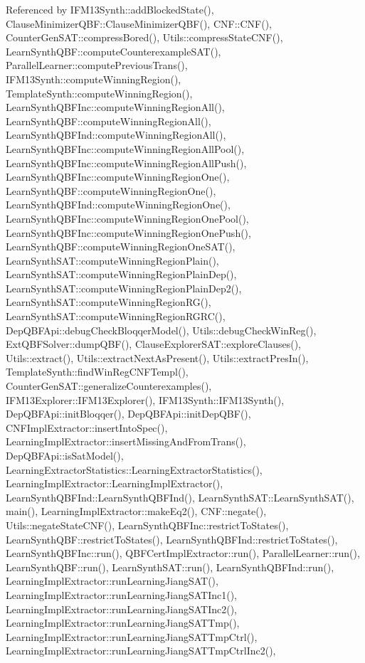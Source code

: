 Referenced by I\-F\-M13\-Synth\-::add\-Blocked\-State(), Clause\-Minimizer\-Q\-B\-F\-::\-Clause\-Minimizer\-Q\-B\-F(), C\-N\-F\-::\-C\-N\-F(), Counter\-Gen\-S\-A\-T\-::compress\-Bored(), Utils\-::compress\-State\-C\-N\-F(), Learn\-Synth\-Q\-B\-F\-::compute\-Counterexample\-S\-A\-T(), Parallel\-Learner\-::compute\-Previous\-Trans(), I\-F\-M13\-Synth\-::compute\-Winning\-Region(), Template\-Synth\-::compute\-Winning\-Region(), Learn\-Synth\-Q\-B\-F\-Inc\-::compute\-Winning\-Region\-All(), Learn\-Synth\-Q\-B\-F\-::compute\-Winning\-Region\-All(), Learn\-Synth\-Q\-B\-F\-Ind\-::compute\-Winning\-Region\-All(), Learn\-Synth\-Q\-B\-F\-Inc\-::compute\-Winning\-Region\-All\-Pool(), Learn\-Synth\-Q\-B\-F\-Inc\-::compute\-Winning\-Region\-All\-Push(), Learn\-Synth\-Q\-B\-F\-Inc\-::compute\-Winning\-Region\-One(), Learn\-Synth\-Q\-B\-F\-::compute\-Winning\-Region\-One(), Learn\-Synth\-Q\-B\-F\-Ind\-::compute\-Winning\-Region\-One(), Learn\-Synth\-Q\-B\-F\-Inc\-::compute\-Winning\-Region\-One\-Pool(), Learn\-Synth\-Q\-B\-F\-Inc\-::compute\-Winning\-Region\-One\-Push(), Learn\-Synth\-Q\-B\-F\-::compute\-Winning\-Region\-One\-S\-A\-T(), Learn\-Synth\-S\-A\-T\-::compute\-Winning\-Region\-Plain(), Learn\-Synth\-S\-A\-T\-::compute\-Winning\-Region\-Plain\-Dep(), Learn\-Synth\-S\-A\-T\-::compute\-Winning\-Region\-Plain\-Dep2(), Learn\-Synth\-S\-A\-T\-::compute\-Winning\-Region\-R\-G(), Learn\-Synth\-S\-A\-T\-::compute\-Winning\-Region\-R\-G\-R\-C(), Dep\-Q\-B\-F\-Api\-::debug\-Check\-Bloqqer\-Model(), Utils\-::debug\-Check\-Win\-Reg(), Ext\-Q\-B\-F\-Solver\-::dump\-Q\-B\-F(), Clause\-Explorer\-S\-A\-T\-::explore\-Clauses(), Utils\-::extract(), Utils\-::extract\-Next\-As\-Present(), Utils\-::extract\-Pres\-In(), Template\-Synth\-::find\-Win\-Reg\-C\-N\-F\-Templ(), Counter\-Gen\-S\-A\-T\-::generalize\-Counterexamples(), I\-F\-M13\-Explorer\-::\-I\-F\-M13\-Explorer(), I\-F\-M13\-Synth\-::\-I\-F\-M13\-Synth(), Dep\-Q\-B\-F\-Api\-::init\-Bloqqer(), Dep\-Q\-B\-F\-Api\-::init\-Dep\-Q\-B\-F(), C\-N\-F\-Impl\-Extractor\-::insert\-Into\-Spec(), Learning\-Impl\-Extractor\-::insert\-Missing\-And\-From\-Trans(), Dep\-Q\-B\-F\-Api\-::is\-Sat\-Model(), Learning\-Extractor\-Statistics\-::\-Learning\-Extractor\-Statistics(), Learning\-Impl\-Extractor\-::\-Learning\-Impl\-Extractor(), Learn\-Synth\-Q\-B\-F\-Ind\-::\-Learn\-Synth\-Q\-B\-F\-Ind(), Learn\-Synth\-S\-A\-T\-::\-Learn\-Synth\-S\-A\-T(), main(), Learning\-Impl\-Extractor\-::make\-Eq2(), C\-N\-F\-::negate(), Utils\-::negate\-State\-C\-N\-F(), Learn\-Synth\-Q\-B\-F\-Inc\-::restrict\-To\-States(), Learn\-Synth\-Q\-B\-F\-::restrict\-To\-States(), Learn\-Synth\-Q\-B\-F\-Ind\-::restrict\-To\-States(), Learn\-Synth\-Q\-B\-F\-Inc\-::run(), Q\-B\-F\-Cert\-Impl\-Extractor\-::run(), Parallel\-Learner\-::run(), Learn\-Synth\-Q\-B\-F\-::run(), Learn\-Synth\-S\-A\-T\-::run(), Learn\-Synth\-Q\-B\-F\-Ind\-::run(), Learning\-Impl\-Extractor\-::run\-Learning\-Jiang\-S\-A\-T(), Learning\-Impl\-Extractor\-::run\-Learning\-Jiang\-S\-A\-T\-Inc1(), Learning\-Impl\-Extractor\-::run\-Learning\-Jiang\-S\-A\-T\-Inc2(), Learning\-Impl\-Extractor\-::run\-Learning\-Jiang\-S\-A\-T\-Tmp(), Learning\-Impl\-Extractor\-::run\-Learning\-Jiang\-S\-A\-T\-Tmp\-Ctrl(), Learning\-Impl\-Extractor\-::run\-Learning\-Jiang\-S\-A\-T\-Tmp\-Ctrl\-Inc2(), 